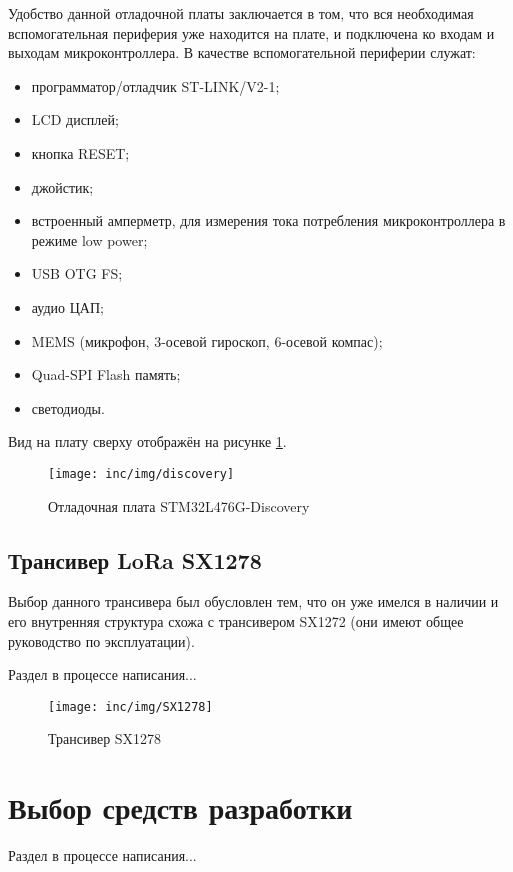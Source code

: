 Удобство данной отладочной платы заключается в том, что вся необходимая вспомогательная периферия уже находится на плате, и подключена ко входам и выходам микроконтроллера.
В качестве вспомогательной периферии служат:

\begin{itemize}
 \item программатор/отладчик ST-LINK/V2-1;
 \item LCD дисплей;
 \item кнопка RESET;
 \item джойстик;
 \item встроенный амперметр, для измерения тока потребления микроконтроллера в режиме low power;
 \item USB OTG FS;
 \item аудио ЦАП;
 \item MEMS (микрофон, 3-осевой гироскоп, 6-осевой компас);
 \item Quad-SPI Flash память;
 \item светодиоды.
\end{itemize}

Вид на плату сверху отображён на рисунке \ref{fig:discovery}.

\begin{figure}[!h]
  \centering
  \texttt{[image: inc/img/discovery]}
  \caption{Отладочная плата STM32L476G-Discovery}
  \label{fig:discovery}
\end{figure}

\subsection{Трансивер LoRa SX1278}

Выбор данного трансивера был обусловлен тем, что он уже имелся в наличии и его внутренняя структура схожа с трансивером SX1272 (они имеют общее руководство по эксплуатации).

Раздел в процессе написания...

\begin{figure}[!h]
  \centering
  \texttt{[image: inc/img/SX1278]}
  \caption{Трансивер SX1278}
  \label{fig:sx1278}
\end{figure}

\section{Выбор средств разработки}

Раздел в процессе написания...

